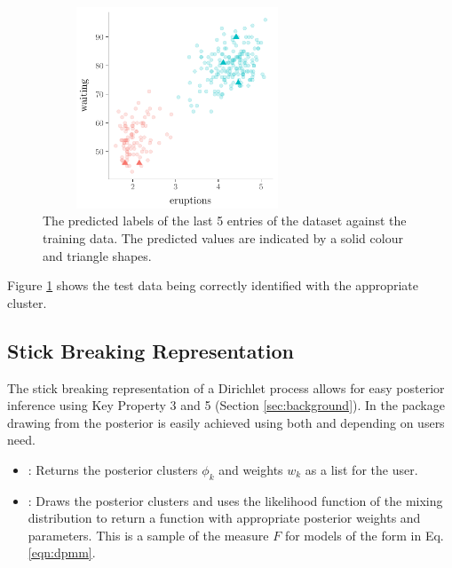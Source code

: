 \documentclass[nojss]{jss}
\begin{document}
\begin{figure}[tb]
\centering
	\includegraphics[height=60mm, width=80mm]{img/faithful_pred_plot.pdf}
\caption{The predicted labels of the last 5 entries of the  dataset against the training data. The predicted values are indicated by a solid colour and triangle shapes.}
\label{fig:faithfulpred}
\end{figure}
Figure \ref{fig:faithfulpred} shows the test data being correctly identified with the appropriate cluster.


\subsection{Stick Breaking Representation}
The stick breaking representation of a Dirichlet process allows for easy posterior inference using Key Property 3 and 5 (Section \ref{sec:background}). In the  package drawing from the posterior is easily achieved using both  and  depending on users need.
\begin{itemize}
\item {}: Returns the posterior clusters $\phi _k$ and weights $w_k$ as a list for the user.
\item {}: Draws the posterior clusters and uses the likelihood function of the mixing distribution to return a function with appropriate posterior weights and parameters. This is a sample of the measure $F$ for models of the form in Eq. \eqref{eqn:dpmm}.
\end{itemize}
\end{document}
